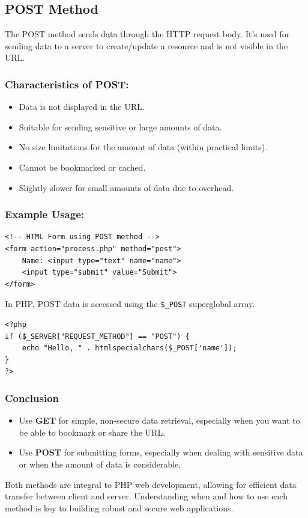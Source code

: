 \documentclass[11pt]{article}
\begin{document}
\subsection{POST Method}
\label{sec:org4e18039}
The POST method sends data through the HTTP request body. It's used for
sending data to a server to create/update a resource and is not visible
in the URL.

\subsubsection{Characteristics of POST:}
\label{sec:org27c20e4}
\begin{itemize}
\item Data is not displayed in the URL.
\item Suitable for sending sensitive or large amounts of data.
\item No size limitations for the amount of data (within practical limits).
\item Cannot be bookmarked or cached.
\item Slightly slower for small amounts of data due to overhead.
\end{itemize}

\subsubsection{Example Usage:}
\label{sec:orgbb4e5ab}
\begin{verbatim}
<!-- HTML Form using POST method -->
<form action="process.php" method="post">
    Name: <input type="text" name="name">
    <input type="submit" value="Submit">
</form>
\end{verbatim}

In PHP, POST data is accessed using the \texttt{\$\_POST} superglobal array.

\begin{verbatim}
<?php
if ($_SERVER["REQUEST_METHOD"] == "POST") {
    echo "Hello, " . htmlspecialchars($_POST['name']);
}
?>
\end{verbatim}

\subsubsection{Conclusion}
\label{sec:org7d305a4}
\begin{itemize}
\item Use \textbf{GET} for simple, non-secure data retrieval, especially when you
want to be able to bookmark or share the URL.
\item Use \textbf{POST} for submitting forms, especially when dealing with
sensitive data or when the amount of data is considerable.
\end{itemize}

Both methods are integral to PHP web development, allowing for efficient
data transfer between client and server. Understanding when and how to
use each method is key to building robust and secure web applications.
\end{document}
